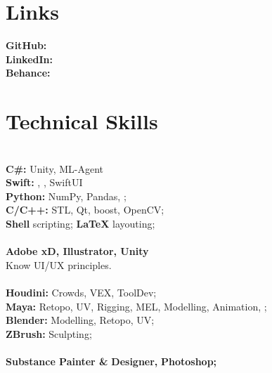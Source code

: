 \documentclass[]{cv-class}
\begin{document}
\begin{minipage}[t]{0.33\textwidth}
\section{Links}
\textcolor{subsec_col}{\textbf{GitHub:}}  \\
\textcolor{subsec_col}{\textbf{LinkedIn:}}  \\
\textcolor{subsec_col}{\textbf{Behance:}} 

\smallSeparator{.5pt}
\section{Technical Skills}
{} \\
\textbf{C\#:} Unity, ML-Agent \\
\textbf{Swift:} , , SwiftUI \\
\textbf{Python:} NumPy, Pandas, ; \\
\textbf{C/C++:} STL, Qt, boost, OpenCV; \\
\textbf{Shell} scripting; \textbf{\LaTeX} layouting;\\

{} \\
\textbf{Adobe xD, Illustrator, Unity}\\
Know UI/UX principles. \\

{} \\
\textbf{Houdini:} Crowds, VEX, ToolDev; \\
\textbf{Maya:} Retopo, UV, Rigging, MEL, Modelling, Animation, ; \\
\textbf{Blender:} Modelling, Retopo, UV; \\
\textbf{ZBrush:} Sculpting; \\

{} \\
\textbf{Substance Painter \&}
\textbf{Designer,}
\textbf{Photoshop;} \\


\end{minipage}
\end{document}
